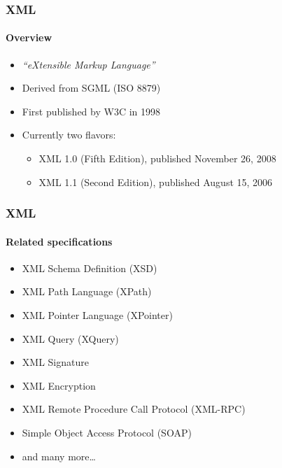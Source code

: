 \documentclass[
    alternativetitlepage=alternativ,
    cornerlogo=hgi_nds_logo2,
    sectionoverview,
]{rubpresentation}
\begin{document}
\begin{frame}
    \frametitle{XML}
    \framesubtitle{Overview}
    \begin{itemize}
        \item{} \emph{\enquote{eXtensible Markup Language}}\\
        \item{} Derived from SGML (ISO 8879)\\
        \item{} First published by W3C in 1998\\
        \item{} Currently two flavors:
            \begin{itemize}
                \item{} XML 1.0 (Fifth Edition), published November 26, 2008\\
                \item{} XML 1.1 (Second Edition), published August 15, 2006\\
            \end{itemize}
    \end{itemize}
\end{frame}

\begin{frame}
    \frametitle{XML}
    \framesubtitle{Related specifications}
    \begin{itemize}
        \item{} XML Schema Definition (XSD)\\
        \item{} XML Path Language (XPath)\\
        \item{} XML Pointer Language (XPointer)\\
        \item{} XML Query (XQuery)\\
        \item{} XML Signature\\
        \item{} XML Encryption\\
        \item{} XML Remote Procedure Call Protocol (XML-RPC)\\
        \item{} Simple Object Access Protocol (SOAP)
        \item{} and many more\ldots\\
    \end{itemize}
\end{frame}
\end{document}
